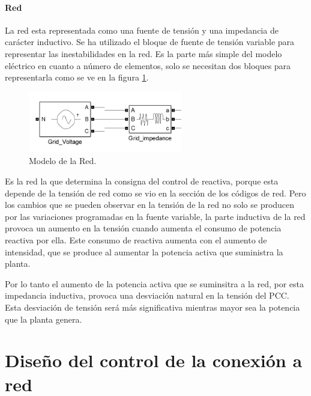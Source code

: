 \documentclass{book}
\begin{document}
		\paragraph{Red} 

La red esta representada como una fuente de tensi\'on y una impedancia de car\'acter inductivo. Se ha utilizado el bloque de fuente de tensi\'on variable para representar las inestabilidades en la red. Es la parte más simple del modelo el\'ectrico en cuanto a n\'umero de elementos, solo se necesitan dos bloques para representarla como se ve en la figura \ref{GridSimulink}. \par

\begin{figure}[h!]
\centering
\includegraphics[width=0.6\textwidth]{GridSimulink.PNG}
\caption{Modelo de la Red. }
\label{GridSimulink}
\end{figure} \par

Es la red la que determina la consigna del control de reactiva, porque esta depende de la tensi\'on de red como se vio en la secci\'on de los c\'odigos de red. Pero los cambios que se pueden observar en la tensi\'on de la red no solo se producen por las variaciones programadas en la fuente variable, la parte inductiva de la red provoca un aumento en la tensi\'on cuando aumenta el consumo de potencia reactiva por ella. Este consumo de reactiva aumenta con el aumento de intensidad, que se produce al aumentar la potencia activa que suministra la planta.  \par

Por lo tanto el aumento de la potencia activa que se suminsitra a la red, por esta impedancia inductiva, provoca una desviaci\'on natural en la tensi\'on del PCC. Esta desviaci\'on de tensi\'on ser\'a m\'as significativa mientras mayor sea la potencia que la planta genera. \par

	\section{Diseño del control de la conexi\'on a red}
\end{document}
